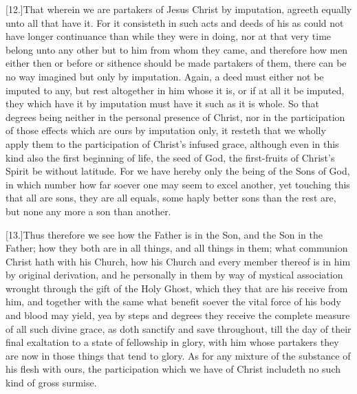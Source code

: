 [12.]That wherein we are partakers of Jesus Christ by imputation, agreeth equally unto all that have it. For it consisteth in such acts and deeds of his as could not have longer continuance than while they were in doing, nor at that very time belong unto any other but to him from whom they came, and therefore how men either then or before or sithence should be made partakers of them, there can be no way imagined but only by imputation. Again, a deed must either not be imputed to any, but rest altogether in him whose it is, or if at all it be imputed, they which have it by imputation must have it such as it is whole. So that degrees being neither in the personal presence of Christ, nor in the participation of those effects which are ours by imputation only, it resteth that we wholly apply them to the participation of Christ’s infused grace, although even in this kind also the first  beginning of life, the seed of God, the first-fruits of Christ’s Spirit be without latitude.
 For we have hereby only the being of the Sons of God, in which number how far soever one may seem to excel another, yet touching this that all are sons, they are all equals, some haply better sons than the rest are, but none any more a son than another.

[13.]Thus therefore we see how the Father is in the Son, and the Son in the Father; how they both are in all things, and all things in them; what communion Christ hath with his Church, how his Church and every member thereof is in him by original derivation, and he personally in them by way of mystical association wrought through the gift of the Holy Ghost, which they that are his receive from him, and together with the same what benefit soever the vital force of his body and blood may yield, yea by steps and degrees they receive the complete measure of all such divine grace, as doth sanctify and save throughout, till the day of their final exaltation to a state of fellowship in glory, with him whose partakers they are now in those things that tend to glory. As for any mixture of the substance of his flesh with ours, the participation which we have of Christ includeth no such kind of gross surmise.


